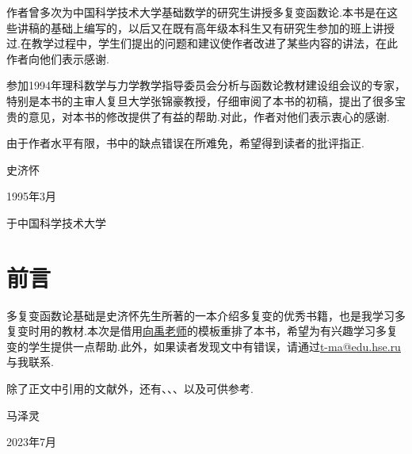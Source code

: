作者曾多次为中国科学技术大学基础数学的研究生讲授多复变函数论.本书是在这些讲稿的基础上编写的，以后又在既有高年级本科生又有研究生参加的班上讲授过.在教学过程中，学生们提出的问题和建议使作者改进了某些内容的讲法，在此作者向他们表示感谢.

参加1994年理科数学与力学教学指导委员会分析与函数论教材建设组会议的专家，特别是本书的主审人复旦大学张锦豪教授，仔细审阅了本书的初稿，提出了很多宝贵的意见，对本书的修改提供了有益的帮助.对此，作者对他们表示衷心的感谢.

由于作者水平有限，书中的缺点错误在所难免，希望得到读者的批评指正.

\vspace*{1cm}
\hfill {\kaishu 史济怀}\hspace*{1.2cm}

\hfill 1995年3月\hspace*{0.8cm}

\hfill 于中国科学技术大学

\newpage
\chapter*{前\qquad 言}
多复变函数论基础是史济怀先生所著的一本介绍多复变的优秀书籍，也是我学习多复变时用的教材.本次是借用\href{https://github.com/yuxtech}{向禹老师}的模板重排了本书，希望为有兴趣学习多复变的学生提供一点帮助.此外，如果读者发现文中有错误，请通过\href{t-ma@edu.hse.ru}{t-ma@edu.hse.ru}与我联系.

除了正文中引用的文献外，还有\cite{龚昇1982多复变数的奇异积分}、\cite{萧荫堂2013多复变函数论}、\cite{钟家庆1983多复分析}、\cite{钟同德1986多复变函数的积分表示与多维奇异积分方程}以及\cite{grauert2012several}可供参考.

\hfill {\kaishu 马泽灵}\hspace*{1.2cm}

\hfill 2023年7月\hspace*{0.8cm}

\clearpage
